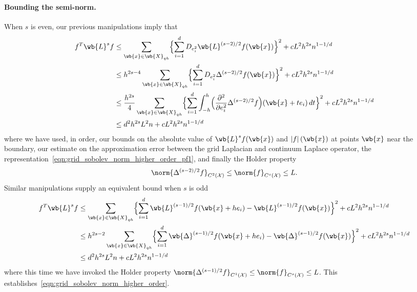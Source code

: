 \documentclass{article}
\newcommand{\abs}[1]{\left \lvert #1 \right \rvert}
\newcommand{\1}{\mathbf{1}}
\newcommand{\Xset}{\mathcal{X}}
\theoremstyle{alden}
\theoremstyle{aldenthm}
\theoremstyle{definition}
\theoremstyle{remark}
\begin{document}
\paragraph{Bounding the semi-norm.}
When $s$ is even, our previous manipulations imply that
\begin{align*}
f^T \wb{L}^s f & \leq \sum_{\wb{x} \in \wb{X}_{qh}} \Bigl\{\sum_{i = 1}^d D_{e_i^2} \wb{L}^{(s - 2)/2}f(\wb{x}) \Bigr\}^2 + cL^2h^{2s}n^{1 - 1/d} \\
& \leq h^{2s - 4}\sum_{\wb{x} \in \wb{X}_{qh}} \Bigl\{\sum_{i = 1}^d D_{e_i^2} \Delta^{(s - 2)/2}f(\wb{x}) \Bigr\}^2 + cL^2h^{2s}n^{1 - 1/d} \\
& \leq \frac{h^{2s}}{4}\sum_{\wb{x} \in \wb{X}_{qh}} \Bigl\{\sum_{i = 1}^d \int_{-h}^{h} \Bigl(\frac{\partial^2}{\partial e_i^2}\Delta^{(s - 2)/2}f\Bigr)(\wb{x} + te_i) \,dt \Bigr\}^2 + cL^2h^{2s}n^{1 - 1/d} \\
& \leq d^2 h^{2s} L^2 n + cL^2h^{2s}n^{1 - 1/d}
\end{align*}
where we have used, in order, our bounds on the absolute value of $\wb{L}^sf(\wb{x})$ and $\abs{f}(\wb{x})$ at points $\wb{x}$ near the boundary, our estimate on the approximation error between the grid Laplacian and continuum Laplace operator, 
the representation~\eqref{eqn:grid_sobolev_norm_higher_order_pf1}, and finally the Holder property
\begin{equation*}
\norm{\Delta^{(s - 2)/2}f}_{C^2(\Xset)} \leq \norm{f}_{C^s(\Xset)} \leq L.
\end{equation*}
Similar manipulations supply an equivalent bound when $s$ is odd
\begin{align*}
f^T \wb{L}^s f & \leq \sum_{\wb{x} \in \wb{X}_{qh}} \Bigl\{\sum_{i = 1}^d \wb{L}^{(s - 1)/2}f(\wb{x} + he_i) - \wb{L}^{(s - 1)/2}f(\wb{x}) \Bigr\}^2 + cL^2h^{2s}n^{1 - 1/d} \\
& \leq h^{2s - 2}\sum_{\wb{x} \in \wb{X}_{qh}} \Bigl\{\sum_{i = 1}^d \wb{\Delta}^{(s - 1)/2}f(\wb{x} + he_i) - \wb{\Delta}^{(s - 1)/2}f(\wb{x}) \Bigr\}^2 + cL^2h^{2s}n^{1 - 1/d} \\
& \leq d^2 h^{2s} L^2 n + cL^2h^{2s}n^{1 - 1/d}
\end{align*}
where this time we have invoked the Holder property $\norm{\Delta^{(s - 1)/2}f}_{C^1(\Xset)} \leq \norm{f}_{C^s(\Xset)} \leq L$. This establishes~\eqref{eqn:grid_sobolev_norm_higher_order}.
\end{document}
